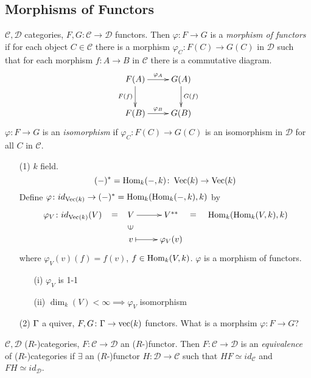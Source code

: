 \subsection{Morphisms of Functors}
\begin{defin}
$\mathcal{C}, \mathcal{D}$ categories, $F, G \colon  \mathcal{C} \to \mathcal{D}$ functors. Then $\varphi \colon  F \to G$ is a \emph{morphism of functors} if for each object $C \in \mathcal{C}$ there is a morphism $\varphi_C \colon  F(C) \to G(C)$ in $\mathcal{D}$ such that for each morphism $f \colon  A \to B$ in $\mathcal{C}$ there is a commutative diagram.
\[\xymatrix{
F(A) \ar[r]^{\varphi_A} \ar[d]_{F(f)} & G(A) \ar[d]^{G(f)}\\
F(B) \ar[r]^{\varphi_B} & G(B)
}\]
$\varphi\colon  F \to G$ is an \emph{isomorphism} if $\varphi_C \colon  F(C) \to G(C)$ is an isomorphism in $\mathcal{D}$ for all $C$ in $\mathcal{C}$.
\end{defin}

\begin{exam}
\begin{enumerate}
\item[]
\item[(1)] $k$ field.
\[(-)^* = \operatorname{Hom}_k(-, k) \colon  \operatorname{Vec}\nolimits(k) \to \operatorname{Vec}\nolimits(k)\]
Define $\varphi\colon  id_{\operatorname{Vec}\nolimits(k)} \to (-)^* = \operatorname{Hom}_k(\operatorname{Hom}_k(-,k), k)$ by
\[\xymatrix@R-1pc{
\varphi_V \colon  id_{\Vec(k)}(V) \ar@{}[r]|-*[@]{=} & V \ar[r] & V^{**}\ar@{}[r]|-*[@]{=} & \Hom_k(\Hom_k(V,k), k)\\
                            & v \ar@{}[u]|-*[@]{\in} \ar@{|->}[r] & \varphi_V(v)
}\]
where $\varphi_V(v)(f) = f(v)$, $f \in \operatorname{Hom}_k(V,k)$. $\varphi$ is a morphism of functors.
\begin{exer}
\begin{enumerate}
\item[]
\item[(i)] $\varphi_V$ is 1-1
\item[(ii)] $\dim_k(V) < \infty \implies \varphi_V$ isomorphism
\end{enumerate}
\end{exer}

\item[(2)] $\Gamma$ a quiver, $F, G\colon  \Gamma \to \operatorname{vec}\nolimits(k)$ functors. What is a morphsim $\varphi \colon  F \to G$?
\end{enumerate}
\end{exam}


\begin{defin}
$\mathcal{C}, \mathcal{D}$ ($R$-)categories, $F\colon  \mathcal{C} \to \mathcal{D}$ an ($R$-)functor. Then $F\colon  \mathcal{C} \to \mathcal{D}$ is an \emph{equivalence} of ($R$-)categories if $\exists$ an ($R$-)functor $H\colon  \mathcal{D} \to \mathcal{C}$ such that $HF \simeq id_\mathcal{C}$ and $FH \simeq id_\mathcal{D}$.
\end{defin}

